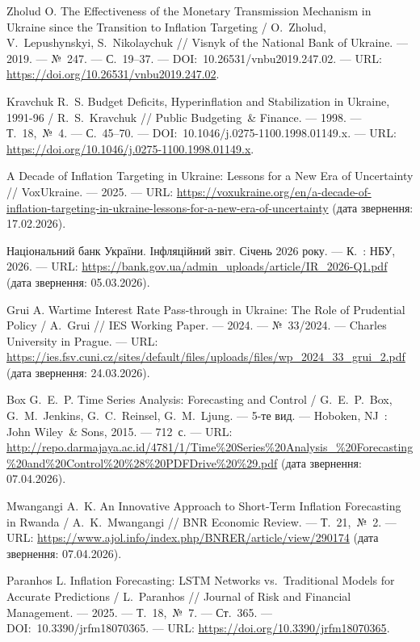 \documentclass{bachelor_thesis}
\begin{document}
\begin{enumerate}[label={[\arabic*]}, leftmargin=0pt, itemindent=0pt, labelindent=0pt]
\item Zholud O. The Effectiveness of the Monetary Transmission Mechanism in Ukraine since the Transition to Inflation Targeting / O.~Zholud, V.~Lepushynskyi, S.~Nikolaychuk // Visnyk of the National Bank of Ukraine. --- 2019. --- №~247. --- С.~19--37. --- DOI:~10.26531/vnbu2019.247.02. --- URL: \url{https://doi.org/10.26531/vnbu2019.247.02}.

\item Kravchuk R.~S. Budget Deficits, Hyperinflation and Stabilization in Ukraine, 1991-96 / R.~S.~Kravchuk // Public Budgeting~\& Finance. --- 1998. --- Т.~18,~№~4. --- С.~45--70. --- DOI:~10.1046/j.0275-1100.1998.01149.x. --- URL: \url{https://doi.org/10.1046/j.0275-1100.1998.01149.x}.

\item A Decade of Inflation Targeting in Ukraine: Lessons for a New Era of Uncertainty // VoxUkraine. --- 2025. --- URL: \url{https://voxukraine.org/en/a-decade-of-inflation-targeting-in-ukraine-lessons-for-a-new-era-of-uncertainty} (дата звернення: 17.02.2026).

\item Національний банк України. Інфляційний звіт. Січень 2026 року. --- К.~: НБУ, 2026. --- URL: \url{https://bank.gov.ua/admin_uploads/article/IR_2026-Q1.pdf} (дата звернення: 05.03.2026).

\item Grui A. Wartime Interest Rate Pass-through in Ukraine: The Role of Prudential Policy / A.~Grui // IES Working Paper. --- 2024. --- №~33/2024. --- Charles University in Prague. --- URL: \url{https://ies.fsv.cuni.cz/sites/default/files/uploads/files/wp_2024_33_grui_2.pdf} (дата звернення: 24.03.2026).

\item Box G.~E.~P. Time Series Analysis: Forecasting and Control / G.~E.~P.~Box, G.~M.~Jenkins, G.~C.~Reinsel, G.~M.~Ljung. --- 5-те вид. --- Hoboken, NJ~: John Wiley~\& Sons, 2015. --- 712~с. --- URL: \url{http://repo.darmajaya.ac.id/4781/1/Time%20Series%20Analysis_%20Forecasting%20and%20Control%20%28%20PDFDrive%20%29.pdf} (дата звернення: 07.04.2026).

\item Mwangangi A.~K. An Innovative Approach to Short-Term Inflation Forecasting in Rwanda / A.~K.~Mwangangi // BNR Economic Review. --- Т.~21,~№~2. --- URL: \url{https://www.ajol.info/index.php/BNRER/article/view/290174} (дата звернення: 07.04.2026).

\item Paranhos L. Inflation Forecasting: LSTM Networks vs.\ Traditional Models for Accurate Predictions / L.~Paranhos // Journal of Risk and Financial Management. --- 2025. --- Т.~18,~№~7. --- Ст.~365. --- DOI:~10.3390/jrfm18070365. --- URL: \url{https://doi.org/10.3390/jrfm18070365}.


\end{enumerate}
\end{document}
